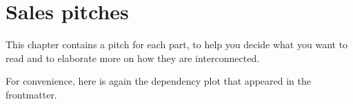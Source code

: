 \chapter{Sales pitches}
\label{ch:sales}

This chapter contains a pitch for each part,
to help you decide what you want to read
and to elaborate more on how they are interconnected.

For convenience, here is again the dependency plot
that appeared in the frontmatter.

